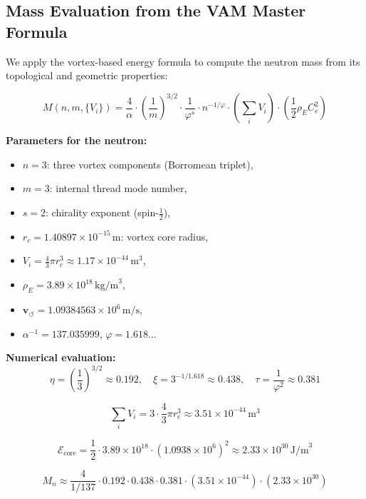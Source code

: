 \subsection{Mass Evaluation from the VAM Master Formula}

We apply the vortex-based energy formula to compute the neutron mass from its topological and geometric properties:

\begin{equation}
\boxed{
M(n, m, \{V_i\}) = \frac{4}{\alpha} \cdot \left( \frac{1}{m} \right)^{3/2} \cdot \frac{1}{\varphi^s} \cdot n^{-1/\varphi} \cdot \left( \sum_i V_i \right) \cdot \left( \frac{1}{2} \rho_{\scriptscriptstyle\boldsymbol\!E}C_e^2 \right)
}
\end{equation}

\noindent
\textbf{Parameters for the neutron:}
\begin{itemize}
    \item \(n = 3\): three vortex components (Borromean triplet),
    \item \(m = 3\): internal thread mode number,
    \item \(s = 2\): chirality exponent (spin-\(\frac{1}{2}\)),
    \item \(r_c = 1.40897 \times 10^{-15} \, \text{m}\): vortex core radius,
    \item \(V_i = \frac{4}{3} \pi r_c^3 \approx 1.17 \times 10^{-44} \, \text{m}^3\),
    \item \(\rho_{\scriptscriptstyle\boldsymbol\!E}= 3.89 \times 10^{18} \, \text{kg/m}^3\),
    \item \(\mathbf{v}_{\scriptscriptstyle\boldsymbol{\circlearrowleft}} = 1.09384563 \times 10^6 \, \text{m/s}\),
    \item \(\alpha^{-1} = 137.035999\), \quad \(\varphi = 1.618...\)
\end{itemize}

\noindent
\textbf{Numerical evaluation:}
\[
\eta = \left( \frac{1}{3} \right)^{3/2} \approx 0.192, \quad
\xi = 3^{-1/1.618} \approx 0.438, \quad
\tau = \frac{1}{\varphi^2} \approx 0.381
\]

\[
\sum_i V_i = 3 \cdot \frac{4}{3} \pi r_c^3 \approx 3.51 \times 10^{-44} \, \text{m}^3
\]

\[
\mathcal{E}_\text{core} = \frac{1}{2} \cdot 3.89 \times 10^{18} \cdot (1.0938 \times 10^6)^2 \approx 2.33 \times 10^{30} \, \text{J/m}^3
\]

\[
M_n \approx \frac{4}{1/137} \cdot 0.192 \cdot 0.438 \cdot 0.381 \cdot (3.51 \times 10^{-44}) \cdot (2.33 \times 10^{30})
\]

